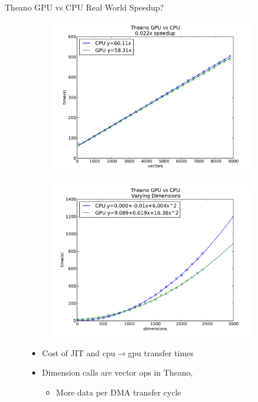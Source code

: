 \documentclass{beamer}
\begin{document}
\begin{frame}{Theano GPU vs CPU}
Real World Speedup?
   \begin{figure}
   \begin{subfigure}
  \centering \includegraphics[scale=.25]{doc/gpucpu}
  \end{subfigure}
  \begin{subfigure}
  \centering \includegraphics[scale=.25]{doc/gpucpuD}
   \end{subfigure}
   \begin{itemize}
    \item Cost of JIT and cpu$\rightarrow$gpu transfer times
    \item Dimension calls are vector ops in Theano,
    \begin{itemize}
      \item More data per DMA transfer cycle
     \end{itemize}
   \end{itemize}



  \end{figure}

\end{frame}
\end{document}
